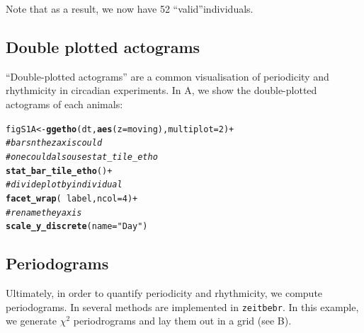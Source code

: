 \documentclass[10pt,letterpaper]{article}\usepackage[]{graphicx}\usepackage[]{color}
\makeatletter
\newcommand{\hlnum}[1]{\textcolor[rgb]{0.686,0.059,0.569}{#1}}%
\newcommand{\hlstr}[1]{\textcolor[rgb]{0.192,0.494,0.8}{#1}}%
\newcommand{\hlcom}[1]{\textcolor[rgb]{0.678,0.584,0.686}{\textit{#1}}}%
\newcommand{\hlopt}[1]{\textcolor[rgb]{0,0,0}{#1}}%
\newcommand{\hlstd}[1]{\textcolor[rgb]{0.345,0.345,0.345}{#1}}%
\newcommand{\hlkwb}[1]{\textcolor[rgb]{0.69,0.353,0.396}{#1}}%
\newcommand{\hlkwc}[1]{\textcolor[rgb]{0.333,0.667,0.333}{#1}}%
\newcommand{\hlkwd}[1]{\textcolor[rgb]{0.737,0.353,0.396}{\textbf{#1}}}%
\newenvironment{kframe}{%
 \def\at@end@of@kframe{}%
 \ifinner\ifhmode%
  \def\at@end@of@kframe{\end{minipage}}%
  \begin{minipage}{\columnwidth}%
 \fi\fi%
 \def\FrameCommand##1{\hskip\@totalleftmargin \hskip-\fboxsep
 \colorbox{shadecolor}{##1}\hskip-\fboxsep
     \hskip-\linewidth \hskip-\@totalleftmargin \hskip\columnwidth}%
 \MakeFramed {\advance\hsize-\width
   \@totalleftmargin\z@ \linewidth\hsize
   \@setminipage}}%
 {\par\unskip\endMakeFramed%
 \at@end@of@kframe}
\newenvironment{knitrout}{}{} %
\makeatother
\begin{document}
Note that as a result, we now have 52 ``valid''individuals.


\subsection*{Double plotted actograms}
``Double-plotted actograms'' are a common visualisation of periodicity and rhythmicity in circadian experiments.
In  A, we show the double-plotted actograms of each animals:

\begin{knitrout}
\color{fgcolor}\begin{kframe}
\begin{alltt}
\hlstd{figS1A} \hlkwb{<-} \hlkwd{ggetho}\hlstd{(dt,} \hlkwd{aes}\hlstd{(}\hlkwc{z} \hlstd{= moving),} \hlkwc{multiplot} \hlstd{=} \hlnum{2}\hlstd{)} \hlopt{+}
            \hlcom{# bars n the z axis could }
            \hlcom{#  one could also use stat_tile_etho}
            \hlkwd{stat_bar_tile_etho}\hlstd{()} \hlopt{+}
            \hlcom{# divide plot by individual}
            \hlkwd{facet_wrap}\hlstd{(} \hlopt{~} \hlstd{label,} \hlkwc{ncol} \hlstd{=} \hlnum{4}\hlstd{)} \hlopt{+}
            \hlcom{# rename the y axis}
            \hlkwd{scale_y_discrete}\hlstd{(}\hlkwc{name}\hlstd{=}\hlstr{"Day"}\hlstd{)}
\end{alltt}
\end{kframe}
\end{knitrout}


\subsection*{Periodograms}
Ultimately, in order to quantify periodicity and rhythmicity, we compute periodograms.
In several methods are implemented in \texttt{zeitbebr}. In this example, we generate $\chi{}^2$ periodrograms and lay them out in a grid (see B).
\end{document}
